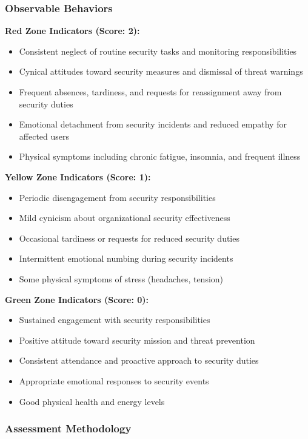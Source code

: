 \documentclass[11pt,a4paper]{article}
\begin{document}
\subsubsection{Observable Behaviors}

\textbf{Red Zone Indicators (Score: 2):}
\begin{itemize}
\item Consistent neglect of routine security tasks and monitoring responsibilities
\item Cynical attitudes toward security measures and dismissal of threat warnings
\item Frequent absences, tardiness, and requests for reassignment away from security duties
\item Emotional detachment from security incidents and reduced empathy for affected users
\item Physical symptoms including chronic fatigue, insomnia, and frequent illness
\end{itemize}

\textbf{Yellow Zone Indicators (Score: 1):}
\begin{itemize}
\item Periodic disengagement from security responsibilities
\item Mild cynicism about organizational security effectiveness
\item Occasional tardiness or requests for reduced security duties
\item Intermittent emotional numbing during security incidents
\item Some physical symptoms of stress (headaches, tension)
\end{itemize}

\textbf{Green Zone Indicators (Score: 0):}
\begin{itemize}
\item Sustained engagement with security responsibilities
\item Positive attitude toward security mission and threat prevention
\item Consistent attendance and proactive approach to security duties
\item Appropriate emotional responses to security events
\item Good physical health and energy levels
\end{itemize}

\subsubsection{Assessment Methodology}
\end{document}
